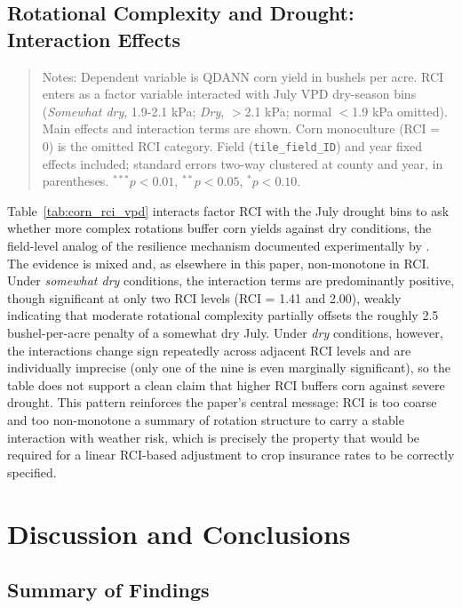 \documentclass[12pt,letterpaper]{article}
\theoremstyle{remark}
\theoremstyle{remark}
\theoremstyle{plain}
\theoremstyle{definition}
\begin{document}
\subsection{\label{subsec:rci_vpd_effects}Rotational Complexity and Drought: Interaction Effects}


\begin{quote}
\small
Notes: Dependent variable is QDANN corn yield in bushels per acre. RCI enters as
a factor variable interacted with July VPD dry-season bins (\emph{Somewhat dry},
1.9-2.1 kPa; \emph{Dry}, $>$2.1 kPa; normal $<$1.9 kPa omitted). Main effects
and interaction terms are shown. Corn monoculture (RCI = 0) is the omitted RCI
category. Field (\texttt{tile\_field\_ID}) and year fixed effects included;
standard errors two-way clustered at county and year, in parentheses.
$^{***}p<0.01$, $^{**}p<0.05$, $^{*}p<0.10$.
\end{quote}

Table~\ref{tab:corn_rci_vpd} interacts factor RCI with the July drought bins to ask whether more complex rotations buffer corn yields against dry conditions, the field-level analog of the resilience mechanism documented experimentally by \citet{bowles2020}. The evidence is mixed and, as elsewhere in this paper, non-monotone in RCI. Under \emph{somewhat dry} conditions, the interaction terms are predominantly positive, though significant at only two RCI levels (RCI = 1.41 and 2.00), weakly indicating that moderate rotational complexity partially offsets the roughly 2.5 bushel-per-acre penalty of a somewhat dry July. Under \emph{dry} conditions, however, the interactions change sign repeatedly across adjacent RCI levels and are individually imprecise (only one of the nine is even marginally significant), so the table does not support a clean claim that higher RCI buffers corn against severe drought. This pattern reinforces the paper's central message: RCI is too coarse and too non-monotone a summary of rotation structure to carry a stable interaction with weather risk, which is precisely the property that would be required for a linear RCI-based adjustment to crop insurance rates to be correctly specified.

\section{\label{sec:conclusions}Discussion and Conclusions}

\subsection{\label{susec:summary}Summary of Findings}
\end{document}

